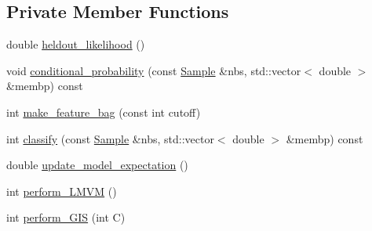 \subsection*{Private Member Functions}
\begin{CompactItemize}
\item 
double \hyperlink{classME__Model_39490060a9aa91c5bfef26db89995d81}{heldout\_\-likelihood} ()
\item 
void \hyperlink{classME__Model_8210bdb521edd5c9293b3ebba75d7c06}{conditional\_\-probability} (const \hyperlink{structME__Model_1_1Sample}{Sample} \&nbs, std::vector$<$ double $>$ \&membp) const 
\item 
int \hyperlink{classME__Model_44b71ee757d6494e852ea36bacfe6634}{make\_\-feature\_\-bag} (const int cutoff)
\item 
int \hyperlink{classME__Model_5683347be55aef212b56dec1fdf54a37}{classify} (const \hyperlink{structME__Model_1_1Sample}{Sample} \&nbs, std::vector$<$ double $>$ \&membp) const 
\item 
double \hyperlink{classME__Model_d21f4e1132f6d710d41d4b3ef206d1f2}{update\_\-model\_\-expectation} ()
\item 
int \hyperlink{classME__Model_754103cb516b470c0d74538e3fca78b6}{perform\_\-LMVM} ()
\item 
int \hyperlink{classME__Model_4ae94151fff132f87341a1c5f91b38d1}{perform\_\-GIS} (int C)
\end{CompactItemize}

